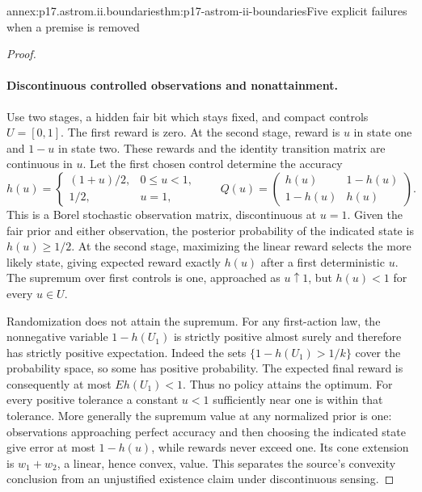 \begin{annexitem}{annex:p17.astrom.ii.boundaries}{thm:p17-astrom-ii-boundaries}{Five explicit failures when a premise is removed}
\begin{proof}
\paragraph{Discontinuous controlled observations and nonattainment.}
Use two stages, a hidden fair bit which stays
fixed, and compact controls \(U=[0,1]\).
The first reward is zero.
At the second stage, reward is \(u\) in
state one and \(1-u\) in state two.
These rewards and the identity transition
matrix are continuous in \(u\).
Let the first chosen control determine
the accuracy
\[
 h(u)=
 \begin{cases}(1+u)/2,&0\leq u<1,\\1/2,&u=1,\end{cases}
 \qquad
 Q(u)=\begin{pmatrix}h(u)&1-h(u)\\1-h(u)&h(u)\end{pmatrix}.
\]
This is a Borel stochastic observation
matrix, discontinuous at \(u=1\).
Given the fair prior and either observation,
the posterior probability of the indicated
state is \(h(u)\geq1/2\).
At the second stage, maximizing the
linear reward selects the more likely
state, giving expected reward exactly
\(h(u)\) after a first deterministic \(u\).
The supremum over first controls is one,
approached as \(u\uparrow1\), but \(h(u)<1\)
for every \(u\in U\).

Randomization does not attain the supremum.
For any first-action law, the nonnegative
variable \(1-h(U_1)\) is strictly positive
almost surely and therefore has strictly
positive expectation. Indeed the sets
\(\{1-h(U_1)>1/k\}\) cover the probability
space, so some has positive probability.
The expected final reward is consequently
at most \(E h(U_1)<1\).
Thus no policy attains the optimum.
For every positive tolerance a constant
\(u<1\) sufficiently near one is within
that tolerance.
More generally the supremum value at
any normalized prior is one: observations
approaching perfect accuracy and then
choosing the indicated state give error
at most \(1-h(u)\), while rewards never
exceed one. Its cone extension is
\(w_1+w_2\), a linear, hence convex, value.
This separates the source's convexity
conclusion from an unjustified existence
claim under discontinuous sensing.
\end{proof}
\end{annexitem}
